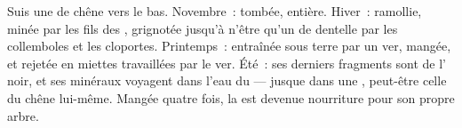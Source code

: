 \begin{example}\label{ex:g6:decomposers-and-soil:leaf}
Suis une  de chêne vers le bas. Novembre~: tombée, entière.
Hiver~: ramollie, minée par les fils des , grignotée
jusqu'à n'être qu'un  de dentelle par les collemboles et
les cloportes. Printemps~: entraînée sous terre par un ver, mangée,
et rejetée en miettes travaillées par le ver. Été~: ses derniers
fragments sont de l' noir, et ses minéraux voyagent dans l'eau
du  --- jusque dans une , peut-être celle du chêne
lui-même. Mangée quatre fois, la  est devenue nourriture pour
son propre arbre.
\end{example}

